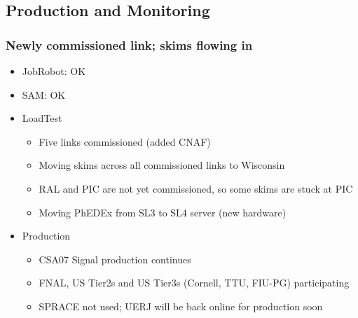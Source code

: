 \documentclass{beamer}
\begin{document}
\subsection{Production and Monitoring}
\begin{frame}
\frametitle{Newly commissioned link; skims flowing in}
\begin{itemize}
    \item JobRobot: OK
    \item SAM: OK
    \item LoadTest
    \begin{itemize}
        \item Five links commissioned (added CNAF)
        \item Moving skims across all commissioned links to Wisconsin
        \item RAL and PIC are not yet commissioned, so some skims are stuck at PIC
        \item Moving PhEDEx from SL3 to SL4 server (new hardware)
    \end{itemize}
    \item Production
    \begin{itemize}
        \item CSA07 Signal production continues
        \item FNAL, US Tier2s and US Tier3s (Cornell, TTU, FIU-PG) participating
        \item SPRACE not used; UERJ will be back online for production soon
    \end{itemize}
\end{itemize}
\end{frame}
\end{document}
